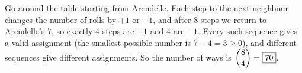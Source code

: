 Go around the table starting from Arendelle. Each step to the next neighbour changes the number of rolls by $+1$ or $-1$, and after $8$ steps we return to Arendelle's $7$, so exactly $4$ steps are $+1$ and $4$ are $-1$. Every such sequence gives a valid assignment (the smallest possible number is $7-4=3\ge0$), and different sequences give different assignments. So the number of ways is $\dbinom84=\boxed{70}$.
